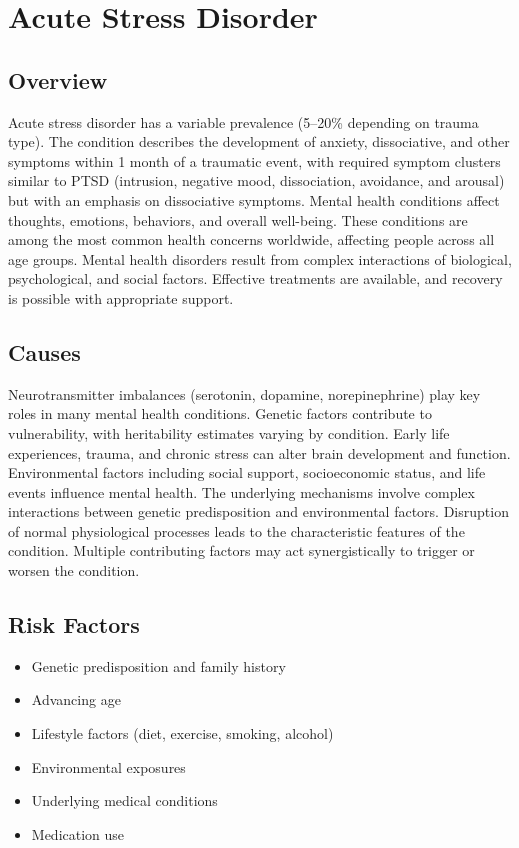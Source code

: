 \chapter{Acute Stress Disorder}
\label{sec:Acute Stress Disorder}

\section{Overview}
Acute stress disorder has a variable prevalence (5--20\% depending on trauma type). The condition describes the development of anxiety, dissociative, and other symptoms within 1 month of a traumatic event, with required symptom clusters similar to PTSD (intrusion, negative mood, dissociation, avoidance, and arousal) but with an emphasis on dissociative symptoms. Mental health conditions affect thoughts, emotions, behaviors, and overall well-being. These conditions are among the most common health concerns worldwide, affecting people across all age groups. Mental health disorders result from complex interactions of biological, psychological, and social factors. Effective treatments are available, and recovery is possible with appropriate support.
\section{Causes}
Neurotransmitter imbalances (serotonin, dopamine, norepinephrine) play key roles in many mental health conditions. Genetic factors contribute to vulnerability, with heritability estimates varying by condition. Early life experiences, trauma, and chronic stress can alter brain development and function. Environmental factors including social support, socioeconomic status, and life events influence mental health. The underlying mechanisms involve complex interactions between genetic predisposition and environmental factors. Disruption of normal physiological processes leads to the characteristic features of the condition. Multiple contributing factors may act synergistically to trigger or worsen the condition.
\section{Risk Factors}
\begin{itemize}[noitemsep]
  \item Genetic predisposition and family history
  \item Advancing age
  \item Lifestyle factors (diet, exercise, smoking, alcohol)
  \item Environmental exposures
  \item Underlying medical conditions
  \item Medication use
\end{itemize}

